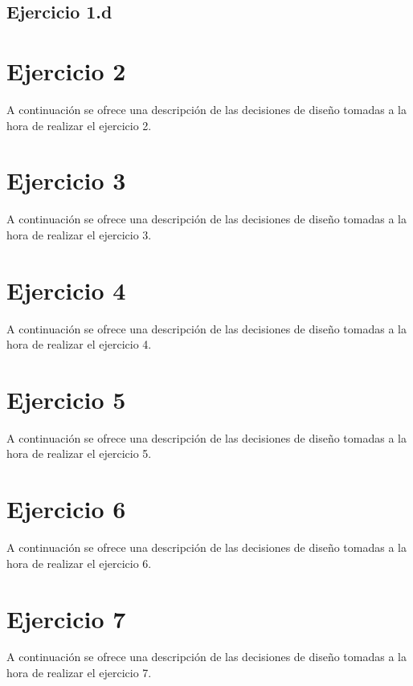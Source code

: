 \documentclass[11pt,a4paper]{article}
\begin{document}
\subsection{Ejercicio 1.d}

\section{Ejercicio 2}

A continuación se ofrece una descripción de las decisiones de diseño tomadas a la hora de realizar el ejercicio 2.

\section{Ejercicio 3}

A continuación se ofrece una descripción de las decisiones de diseño tomadas a la hora de realizar el ejercicio 3.

\section{Ejercicio 4}

A continuación se ofrece una descripción de las decisiones de diseño tomadas a la hora de realizar el ejercicio 4.

\section{Ejercicio 5}

A continuación se ofrece una descripción de las decisiones de diseño tomadas a la hora de realizar el ejercicio 5.

\section{Ejercicio 6}

A continuación se ofrece una descripción de las decisiones de diseño tomadas a la hora de realizar el ejercicio 6.

\section{Ejercicio 7}

A continuación se ofrece una descripción de las decisiones de diseño tomadas a la hora de realizar el ejercicio 7.
\end{document}
